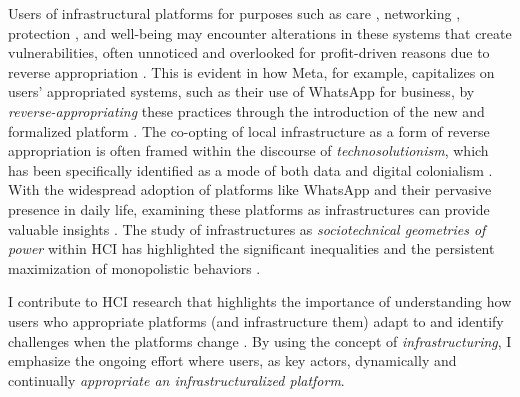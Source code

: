 Users of infrastructural platforms for purposes such as care \cite{10.1145/3544548.3581040}, networking \cite{Crabu2018}, protection \cite{10.1145/3313831.3376339}, and well-being \cite{wilson2016infrastructure} may encounter alterations in these systems that create vulnerabilities, often unnoticed and overlooked for profit-driven reasons due to reverse appropriation \cite{Hague2019, 10.1145/3476080}. This is evident in how Meta, for example, capitalizes on users' appropriated systems, such as their use of WhatsApp for business, by \textit{reverse-appropriating} these practices through the introduction of the new and formalized platform \cite{10.1145/3613905.3651034}. The co-opting of local infrastructure as a form of reverse appropriation is often framed within the discourse of \textit{technosolutionism}, which has been specifically identified as a mode of both data and digital colonialism \cite{mahmoudi2021race}. With the widespread adoption of platforms like WhatsApp and their pervasive presence in daily life, examining these platforms as infrastructures can provide valuable insights \cite{doi:10.1177/1461444816661553, 10.1145/3613905.3651034}. The study of infrastructures as \textit{sociotechnical geometries of power} \cite{graham2001splintering} within HCI has highlighted the significant inequalities and the persistent maximization of monopolistic behaviors \cite{10.1145/2702123.2702573, 10.1145/3491101.3505649, 10.1145/3557890}. 

I contribute to HCI research that highlights the importance of understanding how users who appropriate platforms (and infrastructure them) adapt to and identify challenges when the platforms change \cite{10.1145/3613904.3642590, 10.1145/3359175, doi:10.1177/1461444816629474}. By using the concept of \textit{infrastructuring}, I emphasize the ongoing effort where users, as key actors, dynamically and continually \textit{appropriate an infrastructuralized platform}. 



